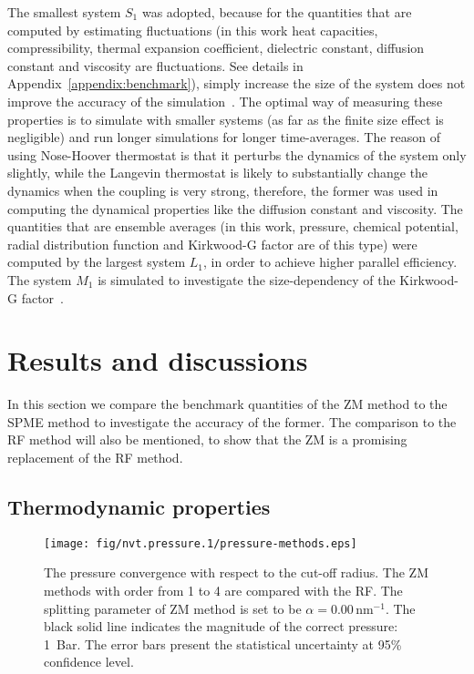 \documentclass[aip,jcp,a4paper,preprint,unsortedaddress,onecolumn,fleqn]{revtex4-1}
\newcommand{\systemsb}{S_1}
\newcommand{\systemmb}{M_1}
\newcommand{\systemlb}{L_1}
\begin{document}

The smallest system $\systemsb$ was adopted,
because for the quantities that are computed  by estimating fluctuations (in this
work heat capacities, compressibility, thermal expansion coefficient, dielectric constant, diffusion constant and
viscosity are fluctuations. See details in Appendix~\ref{appendix:benchmark}), simply increase the size of the
system does not improve the accuracy of the 
simulation~\cite{milchev1986fluctuations,ferrenberg1991statistical}.
The optimal way of measuring these properties
is to simulate with smaller systems (as far as the finite size effect is negligible) and run longer simulations for longer time-averages.
The reason of using Nose-Hoover thermostat is that
it perturbs the dynamics of the system only slightly, while the
Langevin thermostat is likely to substantially change the dynamics
when the coupling is very strong, therefore, the former was used in computing the dynamical
properties like the diffusion constant and viscosity.
The quantities that
are ensemble averages (in this work, pressure, chemical potential, radial distribution function and Kirkwood-G factor are of this type)
were computed by the largest system $\systemlb$,
in order to achieve higher parallel efficiency.
The system $\systemmb$ is simulated to investigate the size-dependency of the
Kirkwood-G factor~\cite{vanderSpoel2006origin}.

\section{Results and discussions}

In this section we compare the benchmark quantities of the ZM method
to the SPME method to investigate the accuracy of the former.
The comparison to the RF method will also be mentioned, to show that
the ZM is a promising replacement of the RF method.

\subsection{Thermodynamic properties}

\begin{figure}
  \centering
  \texttt{[image: fig/nvt.pressure.1/pressure-methods.eps]}
  \caption{The pressure convergence with respect to the cut-off radius.
    The ZM methods with order from 1 to 4 are compared with the RF. 
    The splitting parameter of ZM method is set to be $\alpha = 0.00\,\textrm{nm}^{-1}$.
    The black solid line indicates the magnitude  of the correct pressure: 1~Bar.
    The error bars present the statistical uncertainty at 95\% confidence level.
  }
  \label{fig:pres-comp}
\end{figure}
\end{document}
